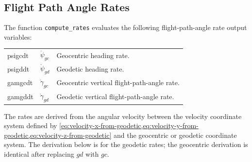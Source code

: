\subsection{Flight Path Angle Rates}\label{sec:flight-path-rates}

The function \texttt{compute\_rates} evaluates the following flight-path-angle rate
output variables:
\begin{longtable}{@{}>{\ttfamily}p{}p{}p{}@{}}
  psigcdt & $\dot\psi_{gc}$ & Geocentric heading rate.\\
  psigddt & $\dot\psi_{gd}$ & Geodetic heading rate.\\
  gamgcdt & $\dot\gamma_{gc}$ & Geocentric vertical flight-path-angle rate.\\
  gamgddt & $\dot\gamma_{gd}$ & Geodetic vertical flight-path-angle rate.\\
\end{longtable}

The rates are derived from the angular velocity between the velocity coordinate
system defined by \cref{eq:velocity-x-from-geodetic,eq:velocity-y-from-geodetic,eq:velocity-z-from-geodetic}
and the geocentric or geodetic coordinate system. The derivation below is for the
geodetic rates; the geocentric derivation is identical after replacing $gd$ with
$gc$.

